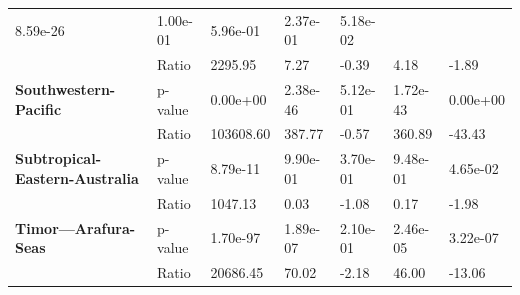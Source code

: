 \begin{table}[H]
{\begin{tabular}{lllllll}
            8.59e-26                                            & 1.00e-01 &
            5.96e-01                                            & 2.37e-01 &
            5.18e-02
            \\
            \textbf{}                                           & Ratio    &
            2295.95                                             & 7.27     &
            -0.39
                                                                & 4.18     &
            -1.89
            \\
            \textbf{Southwestern-Pacific}                       & p-value  &
            0.00e+00                                            & 2.38e-46 &
            5.12e-01                                            & 1.72e-43 &
            0.00e+00
            \\
            \textbf{}                                           & Ratio    &
            103608.60                                           & 387.77   &
            -0.57
                                                                & 360.89   &
            -43.43
            \\
            \textbf{Subtropical-Eastern-Australia}              &
            p-value                                             &
            8.79e-11                                            &
            9.90e-01                                            &
            3.70e-01                                            &
            9.48e-01                                            &
            4.65e-02
            \\
            \textbf{}                                           & Ratio    &
            1047.13                                             & 0.03     &
            -1.08
                                                                & 0.17     &
            -1.98
            \\
            \textbf{Timor---Arafura-Seas}                       & p-value  &
            1.70e-97                                            & 1.89e-07 &
            2.10e-01                                            & 2.46e-05 &
            3.22e-07
            \\
            \textbf{}                                           & Ratio    &
            20686.45                                            & 70.02    &
            -2.18
                                                                & 46.00    &
            -13.06
            \\

\end{tabular}}
\end{table}
